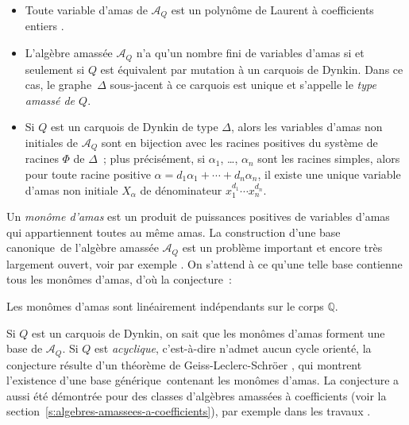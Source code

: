 \documentclass[brochure,12pt]{bourbaki}
\newcommand{\og}{\guillemotleft\hspace*{1pt}}
\newcommand{\fg}{\hspace*{1pt}\guillemotright}
\numberwithin{equation}{subsection}
\numberwithin{theorem}{section}
\newcommand{\Q}{\mathbb{Q}}
\newcommand{\ca}{{\mathcal A}}
\begin{document}
\begin{theo} \label{thm:class-finie-detaillee}
\begin{itemize}
\item[(a)] Toute variable d'amas de $\ca_Q$ est un polyn\^ome de Laurent \`a coefficients entiers
\cite{FominZelevinsky02}.
\item[(b)] L'alg\`ebre amass\'ee $\ca_Q$ n'a qu'un nombre fini de variables d'amas si et seulement
si $Q$ est \'equivalent par mutation \`a un carquois de Dynkin.
Dans ce cas, le graphe~$\Delta$ sous-jacent \`a ce carquois est unique et s'appelle
le {\em type amass\'e de $Q$}.
\item[(c)] Si $Q$ est un carquois de Dynkin de type $\Delta$, alors les variables
d'amas non initiales de $\ca_Q$ sont en bijection avec les racines positives du syst\`eme de racines
$\Phi$ de $\Delta$~; plus pr\'ecis\'ement, si $\alpha_1$, \ldots, $\alpha_n$ sont
les racines simples, alors pour toute racine positive $\alpha=d_1 \alpha_1 + \cdots + d_n \alpha_n$,
il existe une unique variable d'amas non initiale $X_\alpha$ de d\'enominateur
$x_1^{d_1} \cdots  x_n^{d_n}$.
\end{itemize}
\end{theo}

Un {\em mon\^ome d'amas} est un produit de puissances positives
de variables d'amas qui appartiennent toutes au m\^eme amas.
La construction d'une \og base canonique\fg\ de l'alg\`ebre amass\'ee $\ca_Q$
est un probl\`eme important et encore tr\`es largement ouvert, voir
par exemple \cite{ShermanZelevinsky04} \cite{Dupont08} \cite{Cerulli09}.
On s'attend \`a ce qu'une telle base contienne tous les mon\^omes d'amas,
d'o\`u la conjecture~:

\begin{conj} \label{conj:independance}
Les mon\^omes d'amas sont lin\'eairement
ind\'ependants sur le corps $\Q$.
\end{conj}

Si $Q$ est un carquois de Dynkin, on sait \cite{CalderoKeller08} que
les mon\^omes d'amas forment une base de $\ca_Q$. Si $Q$ est {\em
acyclique}, c'est-\`a-dire n'admet aucun cycle orient\'e, la
conjecture r\'esulte d'un th\'eor\`eme de Geiss-Leclerc-Schr\"oer
\cite{GeissLeclercSchroeer07b}, qui montrent l'existence d'une \og base
g\'en\'erique\fg\ contenant les mon\^omes d'amas. La conjecture a aussi
\'et\'e d\'emontr\'ee pour des classes d'alg\`ebres amass\'ees \`a
coefficients (voir la
section~\ref{s:algebres-amassees-a-coefficients}), par exemple dans
les travaux \cite{FuKeller07} \cite{GeissLeclercSchroeer07b}
\cite{Demonet09}.
\end{document}
